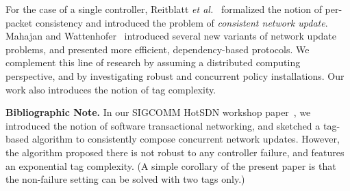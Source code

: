 \documentclass[11pt,pdftex,letter]{article}
\newcommand{\etal}{{\it et al.}\xspace}
\newcommand{\mcnote}[1]{\textcolor{heraldBlue}{\small \bf [MC: #1]}}
\newcommand{\mcnote}[1]{}
\newcommand{\ignore}[1]{}
\begin{document}
For the case of a single controller, Reitblatt \etal~\cite{network-update}
formalized the notion of per-packet consistency and introduced the problem of
\emph{consistent network update}.
Mahajan and Wattenhofer~\cite{roger-hotnets} introduced several new variants
of network update problems, and presented more efficient, dependency-based
protocols. We complement this line of research by assuming a distributed
computing perspective, and by investigating robust and concurrent policy
installations. Our work also introduces the notion of tag complexity.
\ignore{
\mcnote{Removing to save space. We add it back for camera ready}
(The solutions in~\cite{roger-hotnets} require, in the asynchronous network,
an unbounded number of policy tags.)

Detection and prevention of SDN control plane (software) failures is considered
one of the main challenges facing SDNs. An early approach to systematic fault
reproduction was presented in~\cite{ofrewind}. Later work~\cite{nice} leverages
symbolic execution to systematically tackle the fault-tolerance aspect of the
software defined network control plane. Regarding automated policy composition,
our work builds upon the results Foster \etal~\cite{frenetic,pyretic}.
Indeed, the parallel policy composition of Pyretic (operator ``$|$'') is a
building block in the prototype implementation of our control plane.
}

\noindent
\textbf{Bibliographic Note.} In our SIGCOMM HotSDN workshop
paper~\cite{hotsdn13ccc}, we introduced the notion of software transactional
networking, and sketched a tag-based algorithm to consistently compose
concurrent network updates. However, the algorithm proposed there
is not robust to any controller failure, and features an exponential
tag complexity. (A simple corollary of the present paper is that the non-failure
setting can be solved with two tags only.)

\end{document}
